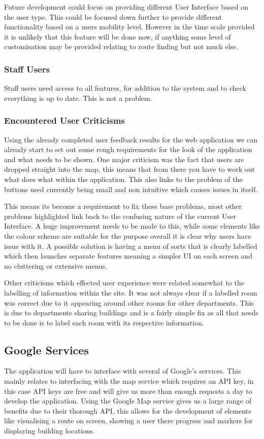 Future development could focus on providing different User Interface based on the user type. This could be focused down further to provide different functionality based on a users mobility level. However in the time scale provided it is unlikely that this feature will be done now, if anything some level of customisation may be provided relating to route finding but not much else.
\subsubsection{Staff Users}
Staff users need access to all features, for addition to the system and to check everything is up to date. This is not a problem.
\subsubsection{Encountered User Criticisms}
Using the already completed user feedback results for the web application we can already start to set out some rough requirements for the look of the application and what needs to be shown. One major criticism was the fact that users are dropped straight into the map, this means that from there you have to work out what does what within the application. This also links to the problem of the buttons used currently being small and non intuitive which causes issues in itself.

This means its become a requirement to fix these base problems, most other problems highlighted link back to the confusing nature of the current User Interface. A huge improvement needs to be made to this, while some elements like the colour scheme are suitable for the purpose overall it is clear why users have issue with it. A possible solution is having a menu of sorts that is clearly labelled which then launches separate features meaning a simpler UI on each screen and no cluttering or extensive menus. 

Other criticisms which effected user experience were related somewhat to the labelling of information within the site. It was not always clear if a labelled room was correct due to it appearing around other rooms for other departments. This is due to departments sharing buildings and is a fairly simple fix as all that needs to be done is to label each room with its respective information. 
\subsection{Google Services}
The application will have to interface with several of Google's services. This mainly relates to interfacing with the map service which requires an API key, in this case API keys are free and will give us more than enough requests a day to develop the application. Using the Google Map service gives us a large range of benefits due to their thorough API\cite{maps}, this allows for the development of elements like visualising a route on screen, showing a user there progress and markers for displaying building locations. 


